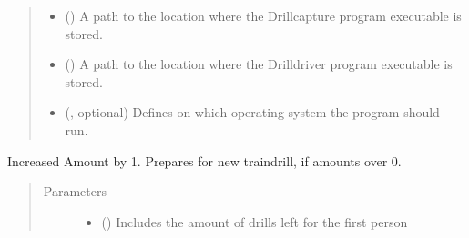\documentclass[letterpaper,10pt,english]{sphinxmanual}
\begin{document}
\begin{fulllineitems}
\begin{quote}
\begin{description}
\begin{itemize}
\item {} 
\sphinxAtStartPar
{} (\sphinxstyleliteralemphasis{\sphinxupquote{, }}) \textendash{} A path to the location where the Drillcapture program executable is stored.

\item {} 
\sphinxAtStartPar
{} (\sphinxstyleliteralemphasis{\sphinxupquote{, }}) \textendash{} A path to the location where the Drilldriver program executable is stored.

\item {} 
\sphinxAtStartPar
{} ({\hyperref[\detokenize{anoog.automation:anoog.automation.py_exe_interface.op}]{}}, optional) \textendash{} Defines on which operating system the program should run.

\end{itemize}

\end{description}\end{quote}

\begin{fulllineitems}
\label{\detokenize{anoog.automation:anoog.automation.controller.Terminal.add_amount}}
\sphinxAtStartPar
Increased Amount by 1. Prepares for new train\sphinxhyphen{}drill, if amounts over 0.
\begin{quote}\begin{description}
\item[{Parameters}] \leavevmode\begin{itemize}
\item {} 
\sphinxAtStartPar
{} () \textendash{} Includes the amount of drills left for the first person


\end{itemize}
\end{description}
\end{quote}
\end{fulllineitems}
\end{fulllineitems}
\end{document}
